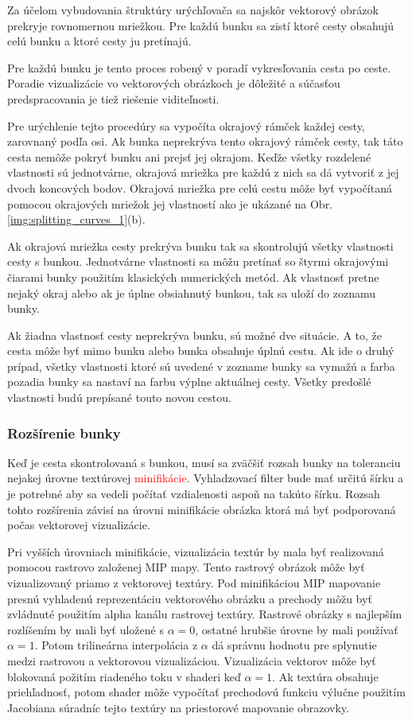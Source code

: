 Za účelom vybudovania štruktúry urýchľovača sa najskôr vektorový obrázok prekryje rovnomernou mriežkou. Pre každú bunku sa zistí ktoré cesty obsahujú celú bunku a ktoré cesty ju pretínajú.

Pre každú bunku je tento proces robený v poradí vykresľovania cesta po ceste. Poradie vizualizácie vo vektorových obrázkoch je dôležité a súčasťou predspracovania je tiež riešenie viditeľnosti.

Pre urýchlenie tejto procedúry sa vypočíta okrajový rámček každej cesty, zarovnaný podľa osi. Ak bunka neprekrýva tento okrajový rámček cesty, tak táto cesta nemôže pokryť bunku ani prejsť jej okrajom. Keďže všetky rozdelené vlastnosti sú jednotvárne, okrajová mriežka pre každú z nich sa dá vytvoriť z jej dvoch koncových bodov. Okrajová mriežka pre celú cestu môže byť vypočítaná pomocou okrajových mriežok jej vlastností ako je ukázané na Obr. \ref{img:splitting_curves_1}(b).

Ak okrajová mriežka cesty prekrýva bunku tak sa skontrolujú všetky vlastnosti cesty s bunkou. Jednotvárne vlastnosti sa môžu pretínať so štyrmi okrajovými čiarami bunky použitím klasických numerických metód. Ak vlastnosť pretne nejaký okraj alebo ak je úplne obsiahnutý bunkou, tak sa uloží do zoznamu bunky.

Ak žiadna vlastnosť cesty neprekrýva bunku, sú možné dve situácie. A to, že cesta môže byť mimo bunku alebo bunka obsahuje úplnú cestu. Ak ide o druhý prípad, všetky vlastnosti ktoré sú uvedené v zozname bunky sa vymažú a farba pozadia bunky sa nastaví na farbu výplne aktuálnej cesty. Všetky predošlé vlastnosti budú prepísané touto novou cestou.

\subsubsection{Rozšírenie bunky}

Keď je cesta skontrolovaná s bunkou, musí sa zväčšiť rozsah bunky na toleranciu nejakej úrovne textúrovej \textcolor{red}{minifikácie}. Vyhladzovací filter bude mať určitú šírku a je potrebné aby sa vedeli počítať vzdialenosti aspoň na takúto šírku. Rozsah tohto rozšírenia závisí na úrovni minifikácie obrázka ktorá má byť podporovaná počas vektorovej vizualizácie.

Pri vyšších úrovniach minifikácie, vizualizácia textúr by mala byť realizovaná pomocou rastrovo založenej MIP mapy. Tento rastrový obrázok môže byť vizualizovaný priamo z vektorovej textúry. Pod minifikáciou MIP mapovanie presnú vyhladenú reprezentáciu vektorového obrázku a prechody môžu byť zvládnuté použitím alpha kanálu rastrovej textúry. Rastrové obrázky s najlepším rozlíšením by mali byť uložené s \(\alpha = 0\), ostatné hrubšie úrovne by mali používať \(\alpha = 1\). Potom trilineárna interpolácia z \(\alpha\) dá správnu hodnotu pre splynutie medzi rastrovou a vektorovou vizualizáciou. Vizualizácia vektorov môže byť blokovaná požitím riadeného toku v shaderi keď \(\alpha = 1\). Ak textúra obsahuje priehľadnosť, potom shader môže vypočítať prechodovú funkciu výlučne použitím Jacobiana súradníc tejto textúry na priestorové mapovanie obrazovky.

